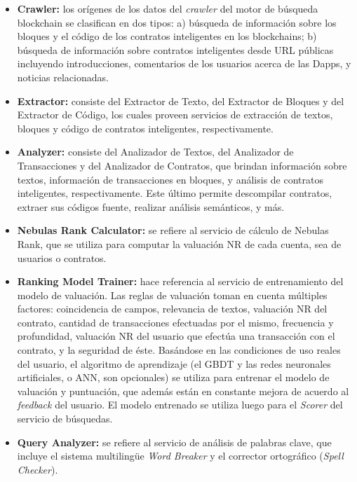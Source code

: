 \begin{itemize}
	\item \textbf{Crawler:} los orígenes de los datos del \textit{crawler} del motor de búsqueda blockchain se clasifican en dos tipos: a) búsqueda de información sobre los bloques y el código de los contratos inteligentes en los blockchains; b) búsqueda de información sobre contratos inteligentes desde URL públicas incluyendo introducciones, comentarios de los usuarios acerca de las Dapps, y noticias relacionadas.

	\item \textbf{Extractor:} consiste del Extractor de Texto, del Extractor de Bloques y del Extractor de Código, los cuales proveen servicios de extracción de textos, bloques y código de contratos inteligentes, respectivamente.

	\item \textbf{Analyzer:} consiste del Analizador de Textos, del Analizador de Transacciones y del Analizador de Contratos, que brindan información sobre textos, información de transacciones en bloques, y análisis de contratos inteligentes, respectivamente. Este último permite descompilar contratos, extraer sus códigos fuente, realizar análisis semánticos, y más.

	\item \textbf{Nebulas Rank Calculator:} se refiere al servicio de cálculo de Nebulas Rank, que se utiliza para computar la valuación NR de cada cuenta, sea de usuarios o contratos.

	\item \textbf{Ranking Model Trainer:} hace referencia al servicio de entrenamiento del modelo de valuación. Las reglas de valuación toman en cuenta múltiples factores: coincidencia de campos, relevancia de textos, valuación NR del contrato, cantidad de transacciones efectuadas por el mismo, frecuencia y profundidad, valuación NR del usuario que efectúa una transacción con el contrato, y la seguridad de éste. Basándose en las condiciones de uso reales del usuario, el algoritmo de aprendizaje (el GBDT y las redes neuronales artificiales, o ANN, son opcionales) se utiliza para entrenar el modelo de valuación y puntuación, que además están en constante mejora de acuerdo al \textit{feedback} del usuario. El modelo entrenado se utiliza luego para el \textit{Scorer} del servicio de búsquedas.

	\item \textbf{Query Analyzer:} se refiere al servicio de análisis de palabras clave, que incluye el sistema multilingüe \textit{Word Breaker} y el corrector ortográfico (\textit{Spell Checker}).


\end{itemize}
